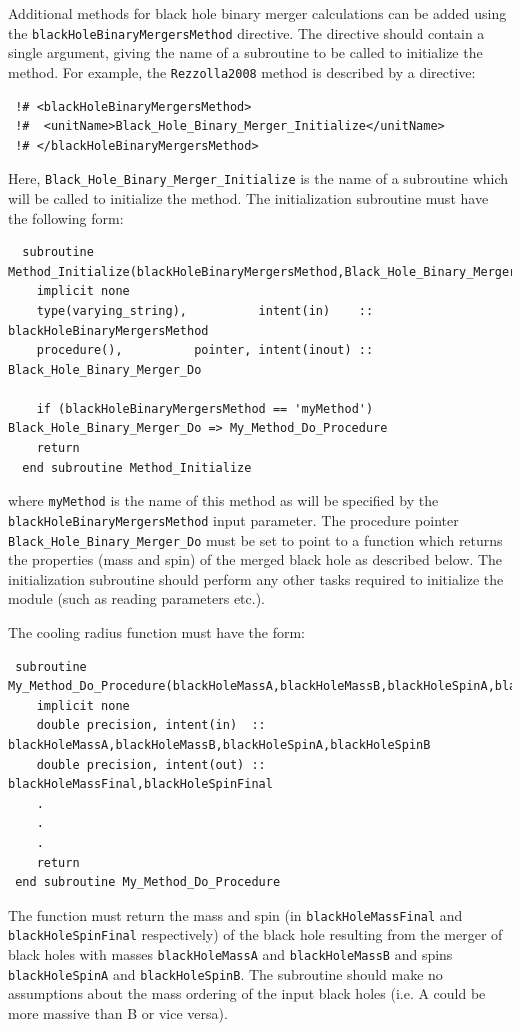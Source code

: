 Additional methods for black hole binary merger calculations can be added using the {\tt blackHoleBinaryMergersMethod} directive. The directive should contain a single argument, giving the name of a subroutine to be called to initialize the method. For example, the {\tt Rezzolla2008} method is described by a directive:
\begin{verbatim}
 !# <blackHoleBinaryMergersMethod>
 !#  <unitName>Black_Hole_Binary_Merger_Initialize</unitName>
 !# </blackHoleBinaryMergersMethod>
\end{verbatim}
Here, {\tt Black\_Hole\_Binary\_Merger\_Initialize} is the name of a subroutine which will be called to initialize the method. The initialization subroutine must have the following form:
\begin{verbatim}
  subroutine Method_Initialize(blackHoleBinaryMergersMethod,Black_Hole_Binary_Merger_Do)
    implicit none
    type(varying_string),          intent(in)    :: blackHoleBinaryMergersMethod
    procedure(),          pointer, intent(inout) :: Black_Hole_Binary_Merger_Do
    
    if (blackHoleBinaryMergersMethod == 'myMethod') Black_Hole_Binary_Merger_Do => My_Method_Do_Procedure
    return
  end subroutine Method_Initialize
\end{verbatim}
where {\tt myMethod} is the name of this method as will be specified by the {\tt blackHoleBinaryMergersMethod} input parameter. The procedure pointer {\tt Black\_Hole\_Binary\_Merger\_Do} must be set to point to a function which returns the properties (mass and spin) of the merged black hole as described below. The initialization subroutine should perform any other tasks required to initialize the module (such as reading parameters etc.).

The cooling radius function must have the form:
\begin{verbatim}
 subroutine My_Method_Do_Procedure(blackHoleMassA,blackHoleMassB,blackHoleSpinA,blackHoleSpinB,blackHoleMassFinal,blackHoleSpinFinal)
    implicit none
    double precision, intent(in)  :: blackHoleMassA,blackHoleMassB,blackHoleSpinA,blackHoleSpinB
    double precision, intent(out) :: blackHoleMassFinal,blackHoleSpinFinal
    .
    .
    .
    return
 end subroutine My_Method_Do_Procedure
\end{verbatim}
The function must return the mass and spin (in {\tt blackHoleMassFinal} and {\tt blackHoleSpinFinal} respectively) of the black hole resulting from the merger of black holes with masses {\tt blackHoleMassA} and {\tt blackHoleMassB} and spins {\tt blackHoleSpinA} and {\tt blackHoleSpinB}. The subroutine should make no assumptions about the mass ordering of the input black holes (i.e. A could be more massive than B or vice versa).

